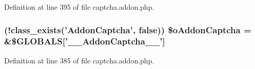 Definition at line 395 of file captcha.\-addon.\-php.

\hypertarget{captcha_8addon_8php_ab9ab3bb5657fc72fca17e44743d1d20a}{
\subsubsection[{\$o\-Addon\-Captcha}]{ (!class\-\_\-exists('Addon\-Captcha', false)) \$o\-Addon\-Captcha = \&\$G\-L\-O\-B\-A\-L\-S\mbox{[}'\-\_\-\-\_\-\-Addon\-Captcha\-\_\-\-\_\-'\mbox{]}}}\label{captcha_8addon_8php_ab9ab3bb5657fc72fca17e44743d1d20a}


Definition at line 385 of file captcha.\-addon.\-php.

